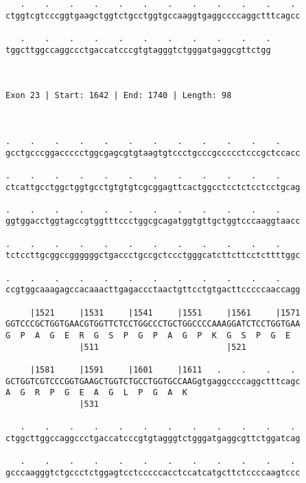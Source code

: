 \documentclass{article}
\begin{document}
\begin{Verbatim}
   .    .    .    .    .    .    .    .    .    .    .    . 
ctggtcgtcccggtgaagctggtctgcctggtgccaaggtgaggccccaggctttcagcc
                                                            
   .    .    .    .    .    .    .    .    .    .    .
tggcttggccaggccctgaccatcccgtgtagggtctgggatgaggcgttctgg
                                                      
                                                      
 
Exon 23 | Start: 1642 | End: 1740 | Length: 98



.    .    .    .    .    .    .    .    .    .    .    .    
gcctgcccggaccccctggcgagcgtgtaagtgtccctgcccgccccctcccgctccacc
                                                            
.    .    .    .    .    .    .    .    .    .    .    .    
ctcattgcctggctggtgcctgtgtgtcgcggagttcactggcctcctctcctcctgcag
                                                            
.    .    .    .    .    .    .    .    .    .    .    .    
ggtggacctggtagccgtggtttccctggcgcagatggtgttgctggtcccaaggtaacc
                                                            
.    .    .    .    .    .    .    .    .    .    .    .    
tctccttgcggccggggggctgaccctgccgctccctgggcatcttcttcctcttttggc
                                                            
.    .    .    .    .    .    .    .    .    .    .    .    
ccgtggcaaagagccacaaacttgagaccctaactgttcctgtgacttcccccaaccagg
                                                            
     |1521     |1531     |1541     |1551     |1561     |1571
GGTCCCGCTGGTGAACGTGGTTCTCCTGGCCCTGCTGGCCCCAAAGGATCTCCTGGTGAA
G  P  A  G  E  R  G  S  P  G  P  A  G  P  K  G  S  P  G  E  
               |511                          |521           
  
     |1581     |1591     |1601     |1611   .    .    .    . 
GCTGGTCGTCCCGGTGAAGCTGGTCTGCCTGGTGCCAAGgtgaggccccaggctttcagc
A  G  R  P  G  E  A  G  L  P  G  A  K                       
               |531                                         
  
   .    .    .    .    .    .    .    .    .    .    .    . 
ctggcttggccaggccctgaccatcccgtgtagggtctgggatgaggcgttctggatcag
                                                            
   .    .    .    .    .    .    .    .    .    .    .    . 
gcccaagggtctgccctctggagtcctcccccacctccatcatgcttctccccaagtccc
                                                            

\end{Verbatim}
\end{document}
